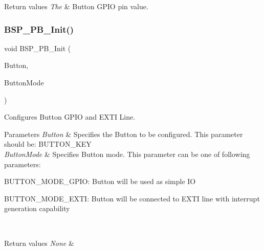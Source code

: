 \begin{DoxyRetVals}{Return values}
{\em The} & Button G\+P\+IO pin value. \\
\hline
\end{DoxyRetVals}
\mbox{\label{group__B-L072Z-LRWAN1__LOW__LEVEL__Exported__Functions_gacfde520fe598ece32657c56408354d2e}} 
\subsubsection{\texorpdfstring{B\+S\+P\+\_\+\+P\+B\+\_\+\+Init()}{BSP\_PB\_Init()}}
{\footnotesize\ttfamily void B\+S\+P\+\_\+\+P\+B\+\_\+\+Init (\begin{DoxyParamCaption}\item[{\hyperlink{group__B-L072Z-LRWAN1__LOW__LEVEL__Exported__Types_ga643816dfbad5c734fc25a29ce8d35bb1}{Button\+\_\+\+Type\+Def}}]{Button,  }\item[{\hyperlink{group__B-L072Z-LRWAN1__LOW__LEVEL__Exported__Types_ga48825b7c7d851c440ef8e808fd9d8f0a}{Button\+Mode\+\_\+\+Type\+Def}}]{Button\+Mode }\end{DoxyParamCaption})}



Configures Button G\+P\+IO and E\+X\+TI Line. 


\begin{DoxyParams}{Parameters}
{\em Button} & Specifies the Button to be configured. This parameter should be\+: B\+U\+T\+T\+O\+N\+\_\+\+K\+EY \\
\hline
{\em Button\+Mode} & Specifies Button mode. This parameter can be one of following parameters\+: \begin{DoxyItemize}
\item B\+U\+T\+T\+O\+N\+\_\+\+M\+O\+D\+E\+\_\+\+G\+P\+IO\+: Button will be used as simple IO \item B\+U\+T\+T\+O\+N\+\_\+\+M\+O\+D\+E\+\_\+\+E\+X\+TI\+: Button will be connected to E\+X\+TI line with interrupt generation capability \end{DoxyItemize}
\\
\hline
\end{DoxyParams}

\begin{DoxyRetVals}{Return values}
{\em None} & \\
\hline
\end{DoxyRetVals}
